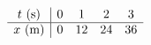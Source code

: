 \documentclass[preview]{standalone}
\begin{document}
\begin{align*}
\special{dvisvgm:raw <g id='unique000'>}\begin{array}{c|cccc} t\ (\text{s}) & 0 & 1 & 2 & 3 \\ \hline x\ (\text{m}) & 0 & 12 & 24 & 36 \end{array}\special{dvisvgm:raw </g>}
\end{align*}
\end{document}
